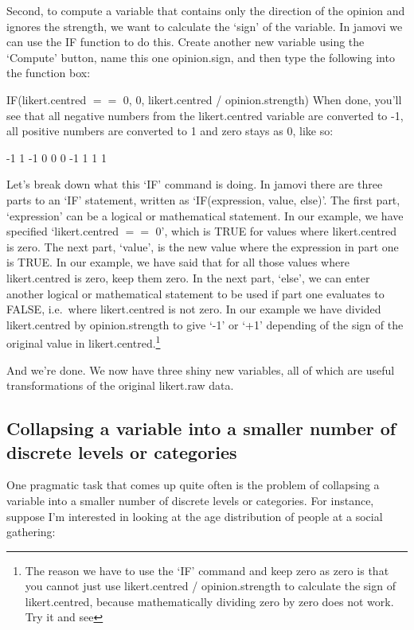 \documentclass[
]{book}
\begin{document}
Second, to compute a variable that contains only the direction of the opinion and ignores the strength, we want to calculate the `sign' of the variable. In jamovi we can use the IF function to do this. Create another new variable using the `Compute' button, name this one opinion.sign, and then type the following into the function box:

IF(likert.centred \(==\) 0, 0, likert.centred / opinion.strength) When done, you'll see that all negative numbers from the likert.centred variable are converted to -1, all positive numbers are converted to 1 and zero stays as 0, like so:

-1 1 -1 0 0 0 -1 1 1 1

Let's break down what this `IF' command is doing. In jamovi there are three parts to an `IF' statement, written as `IF(expression, value, else)'. The first part, `expression' can be a logical or mathematical statement. In our example, we have specified `likert.centred \(==\) 0', which is TRUE for values where likert.centred is zero. The next part, `value', is the new value where the expression in part one is TRUE. In our example, we have said that for all those values where likert.centred is zero, keep them zero. In the next part, `else', we can enter another logical or mathematical statement to be used if part one evaluates to FALSE, i.e.~where likert.centred is not zero. In our example we have divided likert.centred by opinion.strength to give `-1' or `+1' depending of the sign of the original value in likert.centred.\footnote{The reason we have to use the `IF' command and keep zero as zero is that you cannot just use likert.centred / opinion.strength to calculate the sign of likert.centred, because mathematically dividing zero by zero does not work. Try it and see}

And we're done. We now have three shiny new variables, all of which are useful transformations of the original likert.raw data.

\hypertarget{collapsing-a-variable-into-a-smaller-number-of-discrete-levels-or-categories}{%
\subsection{Collapsing a variable into a smaller number of discrete levels or categories}\label{collapsing-a-variable-into-a-smaller-number-of-discrete-levels-or-categories}}

One pragmatic task that comes up quite often is the problem of collapsing a variable into a smaller number of discrete levels or categories. For instance, suppose I'm interested in looking at the age distribution of people at a social gathering:
\end{document}

